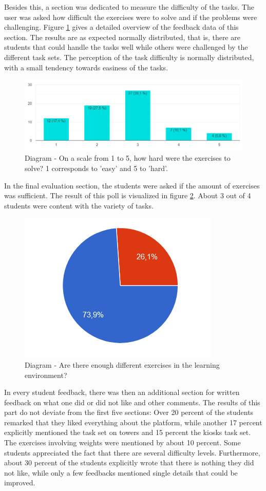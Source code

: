 Besides this, a section was dedicated to measure the difficulty of the tasks. The user was asked how difficult the exercises were to solve and if the problems were challenging. Figure \ref{fig:f5} gives a detailed overview of the feedback data of this section. The results are as expected normally distributed, that is, there are students that could handle the tasks well while others were challenged by the different task sets. The perception of the task difficulty is normally distributed, with a small tendency towards easiness of the tasks.

\begin{figure}[H]
    \centering
    \includegraphics[width=1 \columnwidth]{figures/f5.png}
    \caption{Diagram - On a scale from 1 to 5, how hard were the exercises to solve? 1 corresponds to 'easy' and 5 to 'hard'.}
    \label{fig:f5} 
\end{figure}

In the final evaluation section, the students were asked if the amount of exercises was sufficient. The result of this poll is visualized in figure \ref{fig:f6}. About 3 out of 4 students were content with the variety of tasks.

\begin{figure}[H]
    \centering
    \includegraphics[width=0.5 \columnwidth]{figures/f6.png}
    \caption{Diagram - Are there enough different exercises in the learning environment?} 
    \label{fig:f6} 
\end{figure}
 
In every student feedback, there was then an additional section for written feedback on what one did or did not like and other comments. The results of this part do not deviate from the first five sections: Over 20 percent of the students remarked that they liked everything about the platform, while another 17 percent explicitly mentioned the task set on towers and 15 percent the kiosks task set. The exercises involving weights were mentioned by about 10 percent. Some students appreciated the fact that there are several difficulty levels. Furthermore, about 30 percent of the students explicitly wrote that there is nothing they did not like, while only a few feedbacks mentioned single details that could be improved.

